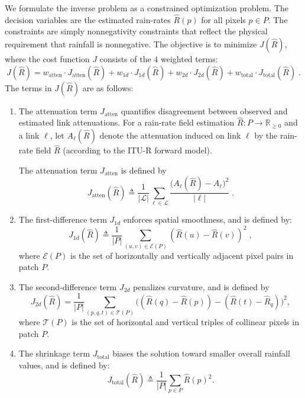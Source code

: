 \documentclass[a4paper,fleqn]{cas-sc}
\begin{document}
We formulate the inverse problem as a constrained optimization problem. The decision variables are the estimated rain-rates \(\hat{R}(p)\) for all pixels \(p \in P\). The constraints are simply nonnegativity constraints that reflect the physical requirement that rainfall is nonnegative. The objective is to minimize $J(\hat{R})$, where the cost function $J$ consists of the $4$ weighted terms:
\[
  J(\hat{R}) =
  w_{\mathrm{atten}} \cdot J_{\mathrm{atten}}(\hat{R})
  +
  w_{1d} \cdot J_{1d}(\hat{R})
  +
  w_{2d} \cdot J_{2d}(\hat{R})
  +
  w_{\mathrm{total}} \cdot J_{\mathrm{total}}(\hat{R})\;.
\]
The terms in $J(\hat{R})$ are as follows:
\begin{enumerate}
  \item The attenuation term $J_{\mathrm{atten}}$ quantifies disagreement between observed and estimated link attenuations.
        For a rain-rate field estimation $\hat{R}:P \rightarrow \mathbb{R}_{\geq 0}$ and a link $\ell$, let $A_{\ell}(\hat{R})$ denote the attenuation induced on link $\ell$ by the rain-rate field $\hat{R}$ (according to the ITU-R forward model).

        The attenuation term $J_{\mathrm{atten}}$ is defined by
        \[
          J_{\mathrm{atten}}(\hat{R}) \triangleq
          \frac{1}{|\mathcal{L}|}
          \sum_{\ell \in \mathcal{L}}
          \frac{\bigl( A_\ell(\hat{R}) - A_\ell \bigr)^2}{|\ell|}\;.
        \]
  \item
        The first-difference term $J_{1d}$ enforces spatial smoothness, and is defined by:
        \[
          J_{1d}(\hat{R}) \triangleq
          \frac{1}{|P|}
          \sum_{(u,v)\in\mathcal{E}(P)} (\hat{R}(u) - \hat{R}(v))^2\;,
        \]
        where $\mathcal{E}(P)$ is the set of horizontally and vertically adjacent pixel pairs in patch $P$.
  \item
        The second-difference term $J_{2d}$ penalizes curvature, and is defined by
        \[
          J_{2d}(\hat{R}) =
          \frac{1}{|P|}
          \sum_{(p,q,t)\in\mathcal{T}(P)} \bigl((\hat{R}(q) - \hat{R}(p)) - (\hat{R}(t) - \hat{R}_q)\bigr)^2,
        \]
        where $\mathcal{T}(P)$ is the set of horizontal and vertical triples of collinear pixels in patch $P$.
  \item
        The shrinkage term $J_{\mathrm{total}}$ biases the solution toward smaller overall rainfall values, and is defined by:
        \[
          J_{\mathrm{total}}(\hat{R}) \triangleq
          \frac{1}{|P|}
          \sum_{p \in P} \hat{R}(p)^2.
        \]
\end{enumerate}
\end{document}
